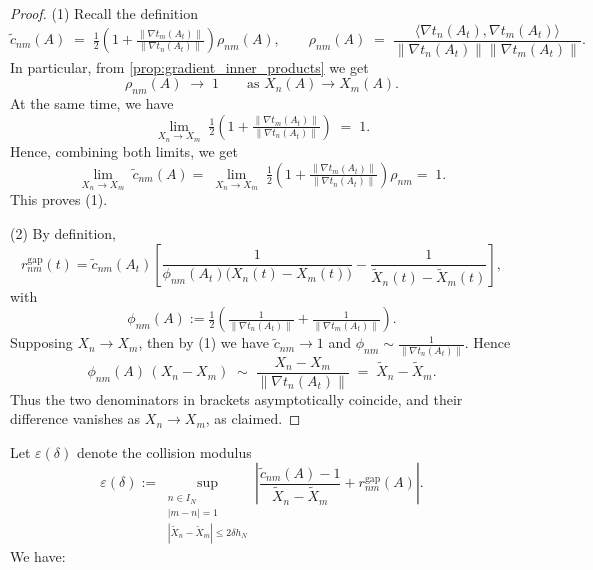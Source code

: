 \documentclass[12pt,reqno]{amsart}
\theoremstyle{plain}
\theoremstyle{definition}
\theoremstyle{remark}
\begin{document}
\begin{proof}
\bigskip
(1) Recall the definition
\begin{equation}
\widetilde c_{nm}(A)\;=\;\tfrac12\!\left(1+\tfrac{\|\nabla t_m(A_t)\|}{\|\nabla t_n(A_t)\|}\right)\rho_{nm}(A),
\qquad
\rho_{nm}(A)\;=\;\frac{\langle \nabla t_n(A_t),\nabla t_m(A_t)\rangle}{\|\nabla t_n(A_t)\| \|\nabla t_m(A_t)\|}.
\end{equation}
In particular, from \ref{prop:gradient_inner_products} we get  
\begin{equation}
\rho_{nm}(A)\;\longrightarrow\;1
\qquad\text{as }X_n(A)\to X_m(A).
\end{equation}
At the same time, we have
\begin{equation}
\lim_{X_n\to X_m}\;\tfrac12\!\left(1+\tfrac{\|\nabla t_m(A_t)\|}{\|\nabla t_n(A_t)\|}\right)\;=\;1.
\end{equation} 
Hence, combining both limits, we get
\begin{equation}
\lim_{X_n\to X_m}\;\widetilde c_{nm}(A)
=\;\lim_{X_n\to X_m}\;\tfrac12\!\left(1+\tfrac{\|\nabla t_m(A_t)\|}{\|\nabla t_n(A_t)\|}\right)\rho_{nm}
=\;1.
\end{equation}
This proves (1).

(2) By definition,
\begin{equation}
r^{\mathrm{gap}}_{nm}(t)
=\widetilde c_{nm}(A_t)\!
\left[\frac{1}{\phi_{nm}(A_t)\big(X_n(t)-X_m(t)\big)}-
\frac{1}{\widetilde X_n(t)-\widetilde X_m(t)}
\right],
\end{equation} 
with 
\begin{equation}
\phi_{nm}(A):=\tfrac12\!\left(\tfrac{1}{\big\|\nabla t_n(A_t) \big\|}+\tfrac{1}{\big\|\nabla t_m(A_t) \big\|}\right).
\end{equation}
Supposing $X_n\to X_m$, then by (1) we have $\widetilde c_{nm}\to 1$ and $\phi_{nm}\sim \tfrac{1}{\big\|\nabla t_n(A_t) \big\|}$.  
Hence
\begin{equation}
\phi_{nm}(A)\,(X_n-X_m) \;\sim\; \frac{X_n-X_m}{\big\|\nabla t_n(A_t) \big\|}
\;=\; \widetilde X_n-\widetilde X_m .
\end{equation}
Thus the two denominators in brackets asymptotically coincide, 
and their difference vanishes as $X_n\to X_m$, as claimed.
\end{proof}
Let $\varepsilon(\delta)$ denote the collision modulus
\begin{equation}
\varepsilon(\delta):=
\sup_{\substack{n\in I_N\\ |m-n|=1\\ |\widetilde X_n-\widetilde X_m|\le 2\delta h_N}}
\left|
\frac{\widetilde c_{nm}(A)-1}{\widetilde X_n-\widetilde X_m} + r^{\mathrm{gap}}_{nm}(A)
\right|.
\end{equation}
We have:
\end{document}
